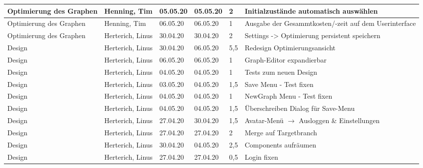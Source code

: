 \begin{longtable}{|p{4cm}|p{2cm}|p{1.2cm}|p{1.2cm}|p{0.7cm}|p{3.8cm}|}
  \hline
  Optimierung des Graphen                                               & Henning, Tim          & 05.05.20 & 05.05.20 & 2     & Initialzustände automatisch auswählen \\
  \hline
  Optimierung des Graphen                                               & Henning, Tim          & 06.05.20 & 06.05.20 & 1     & Ausgabe der Gesammtkosten/-zeit auf dem Userinterface \\
  \hline
  Optimierung des Graphen                                               & Herterich, Linus      & 30.04.20 & 30.04.20 & 2     & Settings -> Optimierung persistent speichern \\
  \hline
  Design                                                                & Herterich, Linus      & 30.04.20 & 06.05.20 & 5,5   & Redesign Optimierungsansicht \\
  \hline
  Design                                                                & Herterich, Linus      & 06.05.20 & 06.05.20 & 1     & Graph-Editor expandierbar \\
  \hline
  Design                                                                & Herterich, Linus      & 04.05.20 & 04.05.20 & 1     & Tests zum neuen Design \\
  \hline
  Design                                                                & Herterich, Linus      & 03.05.20 & 04.05.20 & 1,5   & Save Menu - Test fixen \\
  \hline
  Design                                                                & Herterich, Linus      & 04.05.20 & 04.05.20 & 1     & NewGraph Menu - Test fixen \\
  \hline
  Design                                                                & Herterich, Linus      & 04.05.20 & 04.05.20 & 1,5   & Überschreiben Dialog für Save-Menu \\
  \hline
  Design                                                                & Herterich, Linus      & 27.04.20 & 30.04.20 & 1,5   & Avatar-Menü $\rightarrow$ Ausloggen \& Einstellungen \\
  \hline
  Design                                                                & Herterich, Linus      & 27.04.20 & 27.04.20 & 2     & Merge auf Targetbranch \\
  \hline
  Design                                                                & Herterich, Linus      & 30.04.20 & 04.05.20 & 2,5   & Components aufräumen \\
  \hline
  Design                                                                & Herterich, Linus      & 27.04.20 & 27.04.20 & 0,5   & Login fixen \\

\end{longtable}
